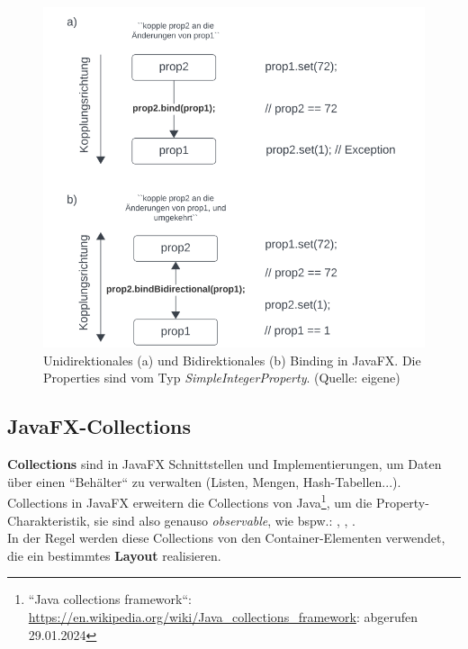 \begin{figure}
    \centering
    \includegraphics[scale=0.5]{chapters/fopt3/img/javafx/binding}
    \caption{Unidirektionales (a) und Bidirektionales (b) Binding in JavaFX. Die Properties sind vom Typ \textit{SimpleIntegerProperty}. (Quelle: eigene)}
    \label{fig:binding}
\end{figure}

\subsection{JavaFX-Collections}

\textbf{Collections} sind in JavaFX Schnittstellen und Implementierungen, um Daten über einen ``Behälter`` zu verwalten (Listen, Mengen, Hash-Tabellen...).\\

\noindent
Collections in JavaFX erweitern die Collections von Java\footnote{
    ``Java collections framework``: \url{https://en.wikipedia.org/wiki/Java_collections_framework}: abgerufen 29.01.2024

}, um die Property-Charakteristik, sie sind also genauso \textit{observable}, wie bspw.: , , .\\

\noindent
In der Regel werden diese Collections von den Container-Elementen verwendet, die ein bestimmtes \textbf{Layout} realisieren.\\

